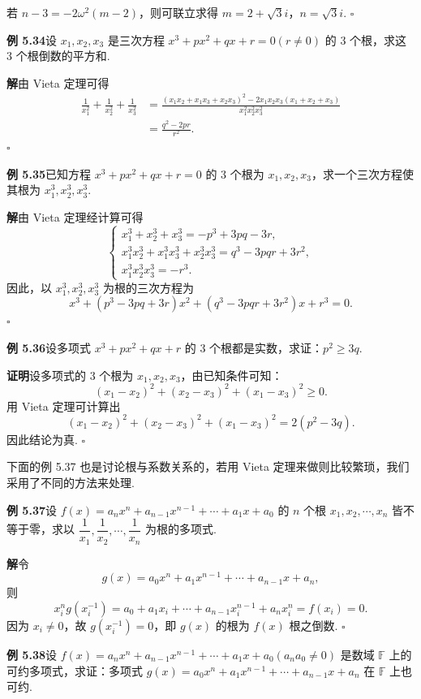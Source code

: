 \documentclass[UTF8, 12pt, fontset=fandol, oneside]{ctexart}
\begin{document}
若 $n-3=-2\omega^2(m-2)$，则可联立求得 $m=2+\sqrt3 i$，$n=\sqrt3 i$. \hfill $\square$

\noindent\textbf{例 5.34}\quad 设 $x_1,x_2,x_3$ 是三次方程 $x^3+px^2+qx+r=0(r\ne0)$ 的 3 个根，求这 3 个根倒数的平方和.

\noindent\textbf{解}\quad 由 Vieta 定理可得
\[
\begin{aligned}
\frac{1}{x_1^2}+\frac{1}{x_2^2}+\frac{1}{x_3^2}
&=\frac{(x_1x_2+x_1x_3+x_2x_3)^2-2x_1x_2x_3(x_1+x_2+x_3)}
{x_1^2x_2^2x_3^2}\\
&=\frac{q^2-2pr}{r^2}.
\end{aligned}
\]
\hfill $\square$

\noindent\textbf{例 5.35}\quad 已知方程 $x^3+px^2+qx+r=0$ 的 3 个根为 $x_1,x_2,x_3$，求一个三次方程使其根为 $x_1^3,x_2^3,x_3^3$.

\noindent\textbf{解}\quad 由 Vieta 定理经计算可得
\[
\left\{
\begin{array}{l}
x_1^3+x_2^3+x_3^3=-p^3+3pq-3r,\\
x_1^3x_2^3+x_1^3x_3^3+x_2^3x_3^3=q^3-3pqr+3r^2,\\
x_1^3x_2^3x_3^3=-r^3.
\end{array}
\right.
\]
因此，以 $x_1^3,x_2^3,x_3^3$ 为根的三次方程为
\[
x^3+(p^3-3pq+3r)x^2+(q^3-3pqr+3r^2)x+r^3=0.
\]
\hfill $\square$

\noindent\textbf{例 5.36}\quad 设多项式 $x^3+px^2+qx+r$ 的 3 个根都是实数，求证：$p^2\ge3q$.

\noindent\textbf{证明}\quad 设多项式的 3 个根为 $x_1,x_2,x_3$，由已知条件可知：
\[
(x_1-x_2)^2+(x_2-x_3)^2+(x_1-x_3)^2\ge0.
\]
用 Vieta 定理可计算出
\[
(x_1-x_2)^2+(x_2-x_3)^2+(x_1-x_3)^2=2(p^2-3q).
\]
因此结论为真. \hfill $\square$

下面的例 5.37 也是讨论根与系数关系的，若用 Vieta 定理来做则比较繁琐，我们采用了不同的方法来处理.

\noindent\textbf{例 5.37}\quad 设 $f(x)=a_nx^n+a_{n-1}x^{n-1}+\cdots+a_1x+a_0$ 的 $n$ 个根 $x_1,x_2,\cdots,x_n$ 皆不等于零，求以 $\dfrac1{x_1},\dfrac1{x_2},\cdots,\dfrac1{x_n}$ 为根的多项式.

\noindent\textbf{解}\quad 令
\[
g(x)=a_0x^n+a_1x^{n-1}+\cdots+a_{n-1}x+a_n,
\]
则
\[
x_i^ng(x_i^{-1})=a_0+a_1x_i+\cdots+a_{n-1}x_i^{n-1}+a_nx_i^n=f(x_i)=0.
\]
因为 $x_i\ne0$，故 $g(x_i^{-1})=0$，即 $g(x)$ 的根为 $f(x)$ 根之倒数. \hfill $\square$

\noindent\textbf{例 5.38}\quad 设 $f(x)=a_nx^n+a_{n-1}x^{n-1}+\cdots+a_1x+a_0(a_na_0\ne0)$ 是数域 $\mathbb{F}$ 上的可约多项式，求证：多项式 $g(x)=a_0x^n+a_1x^{n-1}+\cdots+a_{n-1}x+a_n$ 在 $\mathbb{F}$ 上也可约.
\end{document}
